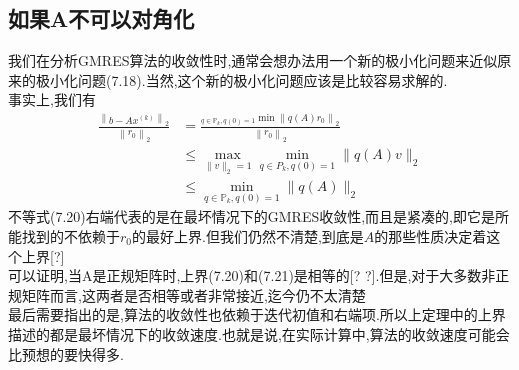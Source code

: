 \documentclass[12pt,a4paper]{article}
\begin{document}
\subsection*{如果A不可以对角化}
我们在分析GMRES算法的收敛性时,通常会想办法用一个新的极小化问题来近似原来的极小化问题(7.18).当然,这个新的极小化问题应该是比较容易求解的.\\
事实上,我们有
$$
\begin{aligned} 
\frac{\left\|b-A x^{(k)}\right\|_{2}}{\left\|r_{0}\right\|_{2}} &=\frac{_{q \in \mathbb{P}_{k}, q(0)=1}{\min }\left\|q(A) r_{0}\right\|_{2}}{\left\|r_{0}\right\|_{2}} \\ 
& \leq \max _{\|v\|_{2}=1} \min _{q \in P_{k}, q(0)=1}\|q(A) v\|_{2} \\
& \leq \min _{q \in \mathbb{P}_{k}, q(0)=1}\|q(A)\|_{2} \end{aligned}
$$
不等式(7.20)右端代表的是在最坏情况下的GMRES收敛性,而且是紧凑的,即它是所能找到的不依赖于$r_{0}$的最好上界.但我们仍然不清楚,到底是$A$的那些性质决定着这个上界[?]\\
可以证明,当A是正规矩阵时,上界(7.20)和(7.21)是相等的[? ?].但是,对于大多数非正规矩阵而言,这两者是否相等或者非常接近,迄今仍不太清楚\\
最后需要指出的是,算法的收敛性也依赖于迭代初值和右端项.所以上定理中的上界描述的都是最坏情况下的收敛速度.也就是说,在实际计算中,算法的收敛速度可能会比预想的要快得多.\\
\end{document}
